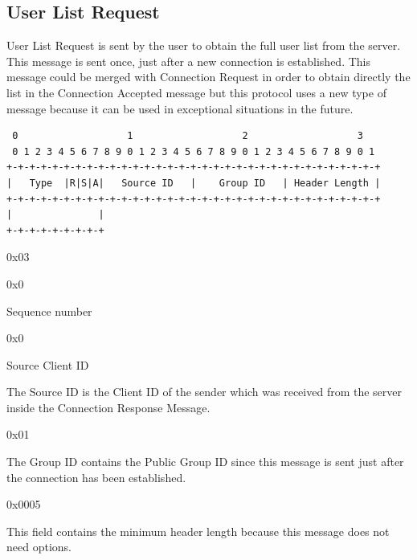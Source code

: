 \documentclass{article}
\begin{document}
\subsection{User List Request}
User List Request is sent by the user to obtain the full user list from the server. This message is sent once, just after a new connection is established. This message could be merged with Connection Request in order to obtain directly the list in the Connection Accepted message but this protocol uses a new type of message because it can be used in exceptional situations in the future.
\begin{verbatim}  
 0                   1                   2                   3  
 0 1 2 3 4 5 6 7 8 9 0 1 2 3 4 5 6 7 8 9 0 1 2 3 4 5 6 7 8 9 0 1
+-+-+-+-+-+-+-+-+-+-+-+-+-+-+-+-+-+-+-+-+-+-+-+-+-+-+-+-+-+-+-+-+
|   Type  |R|S|A|   Source ID   |    Group ID   | Header Length |
+-+-+-+-+-+-+-+-+-+-+-+-+-+-+-+-+-+-+-+-+-+-+-+-+-+-+-+-+-+-+-+-+
|               |
+-+-+-+-+-+-+-+-+
\end{verbatim}
\begin{description}[align=left]
    \item [Type:] 0x03
    
    \item [Reserved:] 0x0
        
    \item [Sequence:] Sequence number
    
    \item [Acknowledgement:] 0x0
    
    \item [Source ID:] Source Client ID
    \begin{flushleft}
        The Source ID is the Client ID of the sender which was received from the server inside the Connection Response Message.
    \end{flushleft}
    
    \item [Group ID:] 0x01
    \begin{flushleft}
        The Group ID contains the Public Group ID since this message is sent just after the connection has been established.
    \end{flushleft}
    
    \item [Header Length:] 0x0005
    \begin{flushleft}
        This field contains the minimum header length because this message does not need options.
    \end{flushleft}

\end{description}
\end{document}
